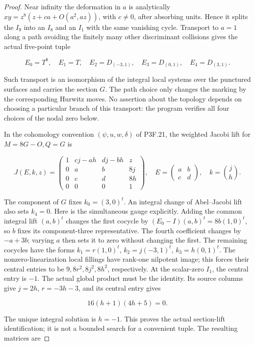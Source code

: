 \begin{proof}
Near infinity the deformation in \(a\) is analytically
\(xy=z^8(z+c a+O(a^2,az))\), with \(c\ne0\), after absorbing
units.  Hence it splits the \(I_9\) into an \(I_8\) and an
\(I_1\) with the same vanishing cycle.  Transport to \(a=1\)
along a path avoiding the finitely many other discriminant
collisions gives the actual five-point tuple

\[
 E_0=T^8,\quad E_1=T,\quad E_2=D_{(-3,1)},\quad
 E_3=D_{(0,1)},\quad E_4=D_{(3,1)}.
\]

Such transport is an isomorphism of the integral local systems
over the punctured surfaces and carries the section \(G\).
The path choice only changes the marking by the corresponding
Hurwitz moves.  No assertion about the topology depends on choosing
a particular branch of this transport: the program verifies all
four choices of the nodal zero below.

In the cohomology convention \((\psi,u,w,\delta)\) of P3F.21,
the weighted Jacobi lift for \(M=8G-O,Q=G\) is

\[
 J(E,k,z)=
 \begin{pmatrix}
 1&cj-ah&dj-bh&z\\
 0&a&b&8j\\
 0&c&d&8h\\
 0&0&0&1
 \end{pmatrix},
 \quad E=\begin{pmatrix}a&b\\c&d\end{pmatrix},
 \quad k=\binom jh.
\]

The component of \(G\) fixes \(k_0=(3,0)^t\).  An integral
change of Abel--Jacobi lift also sets \(k_4=0\).  Here is the
simultaneous gauge explicitly.  Adding the common integral lift
\((a,b)^t\) changes the first cocycle by
\((E_0-I)(a,b)^t=8b(1,0)^t\), so \(b\) fixes its component-three
representative.  The fourth coefficient changes by \(-a+3b\);
varying \(a\) then sets it to zero without changing the first.
The remaining
cocycles have the forms
\(k_1=r(1,0)^t\), \(k_2=j(-3,1)^t\),
\(k_3=h(0,1)^t\).  The nonzero-linearization local fillings
have rank-one nilpotent image; this forces their central entries
to be \(9,8r^2,8j^2,8h^2\), respectively.  At the scalar-zero
\(I_1\), the central entry is \(-1\).  The actual global product
must be the identity.  Its source columns give
\(j=2h\), \(r=-3h-3\), and its central entry gives

\[
 16(h+1)(4h+5)=0.
\]

The unique integral solution is \(h=-1\).  This proves the
actual section-lift identification; it is not a bounded search
for a convenient tuple.  The resulting matrices are


\end{proof}
